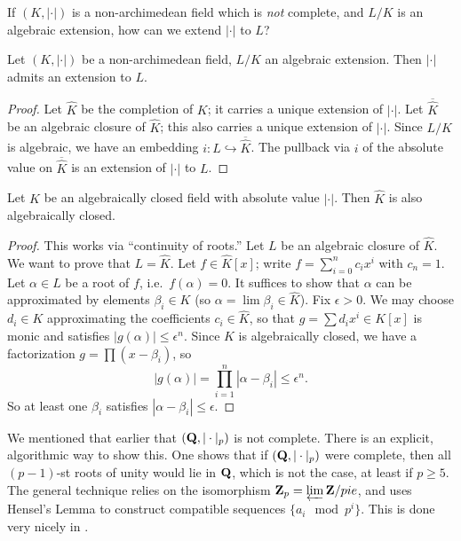 If $(K,|\cdot|)$ is a non-archimedean field which is \emph{not} complete, and 
$L/K$ is an algebraic extension, how can we extend $|\cdot|$ to $L$? 

\begin{theorem}
Let $(K,|\cdot|)$ be a non-archimedean field, $L/K$ an algebraic extension. 
Then $|\cdot|$ admits an extension to $L$. 
\end{theorem}
\begin{proof}
Let $\widehat K$ be the completion of $K$; it carries a unique extension 
of $|\cdot|$. Let $\overline{\widehat K}$ be an algebraic closure of 
$\widehat K$; this also carries a unique extension of $|\cdot|$. Since $L/K$ is 
algebraic, we have an embedding $i:L\hookrightarrow \overline{\widehat K}$. The 
pullback via $i$ of the absolute value on $\overline{\widehat K}$ is an 
extension of $|\cdot|$ to $L$. 
\end{proof}

\begin{theorem}[Krasner]\label{thm:krasner}
Let $K$ be an algebraically closed field with absolute value $|\cdot|$. Then 
$\widehat K$ is also algebraically closed. 
\end{theorem}
\begin{proof}
This works via ``continuity of roots.'' Let $L$ be an algebraic closure of 
$\widehat K$. We want to prove that $L=\widehat K$. Let $f\in \widehat K[x]$; 
write $f=\sum_{i=0}^n c_i x^i$ with $c_n=1$. Let $\alpha\in L$ be a root of 
$f$, i.e.~$f(\alpha)=0$. It suffices to show that $\alpha$ can be approximated 
by elements $\beta_i\in K$ (so $\alpha=\lim \beta_i\in \widehat K$). Fix 
$\epsilon>0$. We may choose $d_i\in K$ approximating the coefficients 
$c_i\in \widehat K$, so that $g=\sum d_i x^i\in K[x]$ is monic and satisfies 
$|g(\alpha)|\leqslant \epsilon^n$. Since $K$ is algebraically closed, we have a 
factorization $g=\prod (x-\beta_i)$, so 
\[
  |g(\alpha)| = \prod_{i=1}^n |\alpha-\beta_i| \leqslant \epsilon^n .
\]
So at least one $\beta_i$ satisfies $|\alpha-\beta_i|\leqslant \epsilon$. 
\end{proof}

We mentioned that earlier that $(\mathbf{Q},|\cdot|_p)$ is not complete. There is an 
explicit, algorithmic way to show this. One shows that if $(\mathbf{Q},|\cdot|_p)$ 
were complete, then all $(p-1)$-st roots of unity would lie in $\mathbf{Q}$, which is 
not the case, at least if $p\geqslant 5$. The general technique relies on the 
isomorphism $\mathbf{Z}_p=\varprojlim \mathbf{Z}/pie$, and uses Hensel's Lemma to construct 
compatible sequences $\{a_i\mod{p^i}\}$. This is done very nicely in 
\cite[3.2.3]{gouvea-1997}. 

